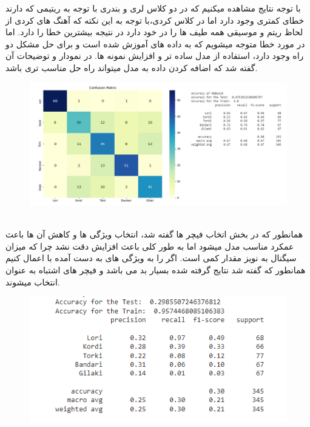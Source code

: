 \documentclass[10pt,onecolumn,a4paper]{article}
\begin{document}
با توجه نتایج مشاهده میکنیم که در دو کلاس لری و بندری با توجه به ریتیمی که دارند خطای کمتری وجود دارد اما در کلاس کردی،با توجه به این نکته که آهنگ های کردی از لحاظ ریتم و موسیقی همه طیف ها را در خود دارد در نتیجه بیشترین خطا را دارد. 
اما در مورد خطا متوجه میشویم که به داده های آموزش  شده است و برای حل مشکل دو راه وجود دارد، استفاده از مدل ساده تر و افزایش نمونه ها. در نمودار    و توضیحات آن گفته شد که اضافه کردن داده به مدل میتواند راه حل مناسب تری باشد.


\begin{figure}[h!]
        \centering
        \includegraphics[scale=0.35]{i.JPG}
        \caption{  }  
    \end{figure}
    \\
همانطور که در بخش اتخاب فیچر ها گفته شد، انتخاب ویژگی ها و کاهش آن ها باعث عمکرد مناسب مدل میشود اما به طور کلی باعث افزایش دقت نشد چرا که میزان سیگنال به نویز مقدار کمی است.
اگر    را به ویژگی های به دست آمده با  اعمال کنیم همانطور که گفته شد نتایج گرفته شده بسیار بد می باشد و فیچر های اشتباه به عنوان   انتخاب میشوند.

\begin{figure}[h!]
        \centering
        \includegraphics[scale=0.5]{j.png}
        \caption{  }  
    \end{figure}
\end{document}

